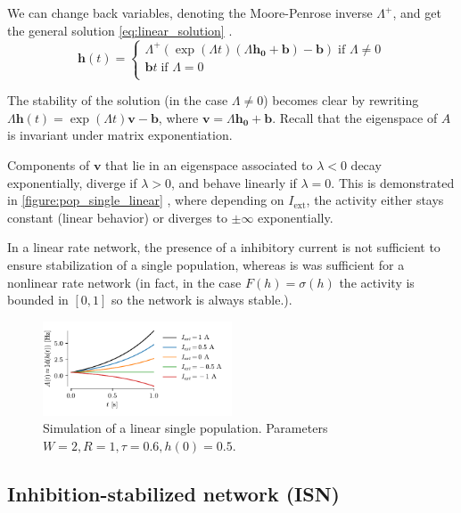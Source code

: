 \documentclass[10pt,conference,compsocconf,a4paper]{IEEEtran}
\renewcommand{\vec}[1]{\boldsymbol{#1}}
\newcommand*{\shortautoref}[1]{%
	\begingroup
	\def\equationautorefname{\textsc{Eq.}}%
	\def\tableautorefname{\textsc{Tab.}}%
	\def\figureautorefname{\textsc{Fig.}}%
	\autoref{#1}%
	\endgroup
}
\begin{document}
		We can change back variables, denoting the Moore-Penrose inverse $\Lambda^+$, and get the general solution \shortautoref{eq:linear_solution}.
\
		\begin{equation} \label{eq:linear_solution}
			\vec{h}(t) = 
			\begin{cases}
				\Lambda^+(\exp(\Lambda t)(\Lambda \vec{h_0} + \vec{b}) - \vec{b}) \; \text{if } \Lambda \neq 0 \\
				\vec{b} t \; \text{if } \Lambda = 0 \\
			\end{cases}
		\end{equation}

		The stability of the solution (in the case $\Lambda \neq 0$) becomes clear by rewriting $\Lambda \vec{h}(t) = \exp(\Lambda t) \vec v - \vec b$, where $\vec v = \Lambda \vec{h_0} + \vec b$. Recall that the eigenspace of $A$ is invariant under matrix exponentiation.

		Components of $\vec{v}$ that lie in an eigenspace associated to $\lambda < 0$ decay exponentially, diverge if $\lambda > 0$, and behave linearly if $\lambda = 0$. This is demonstrated in \shortautoref{figure:pop_single_linear}, where depending on $I_{\text{ext}}$, the activity either stays constant (linear behavior) or diverges to $\pm \infty$ exponentially.

		In a linear rate network, the presence of a inhibitory current is not sufficient to ensure stabilization of a single population, whereas is was sufficient for a nonlinear rate network (in fact, in the case $F(h) = \sigma(h)$ the activity is bounded in $[0, 1]$ so the network is always stable.).

		\begin{figure}
			\centering
			\includegraphics[width=0.5\textwidth]{figures/pop_single_linear.pdf}
			\caption{Simulation of a linear single population. Parameters $W = 2, R = 1, \tau = 0.6, h(0) = 0.5$.}
			\label{figure:pop_single_linear}
		\end{figure}

	\subsection{Inhibition-stabilized network (ISN)}
	\label{sec13}
\end{document}
